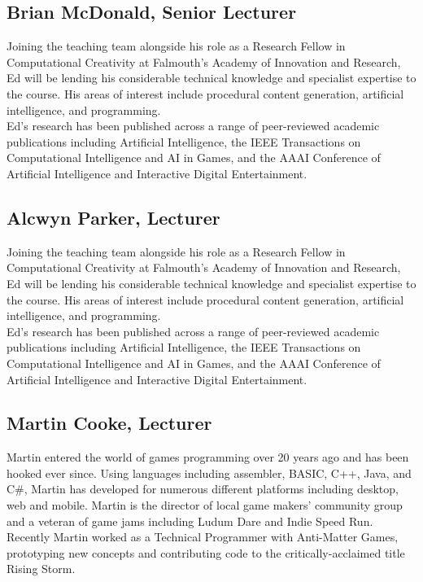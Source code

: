 \subsection{Brian McDonald, Senior Lecturer}

Joining the teaching team alongside his role as a Research Fellow in Computational Creativity at Falmouth's Academy of Innovation and Research, Ed will be lending his considerable technical knowledge and specialist expertise to the course. His areas of interest include procedural content generation, artificial intelligence, and programming. \\

Ed's research has been published across a range of peer-reviewed academic publications including Artificial Intelligence, the IEEE Transactions on Computational Intelligence and AI in Games, and the AAAI Conference of Artificial Intelligence and Interactive Digital Entertainment. \\

\subsection{Alcwyn Parker, Lecturer}

Joining the teaching team alongside his role as a Research Fellow in Computational Creativity at Falmouth's Academy of Innovation and Research, Ed will be lending his considerable technical knowledge and specialist expertise to the course. His areas of interest include procedural content generation, artificial intelligence, and programming. \\

Ed's research has been published across a range of peer-reviewed academic publications including Artificial Intelligence, the IEEE Transactions on Computational Intelligence and AI in Games, and the AAAI Conference of Artificial Intelligence and Interactive Digital Entertainment. \\

\subsection{Martin Cooke, Lecturer}

Martin entered the world of games programming over 20 years ago and has been hooked ever since. Using languages including assembler, BASIC, C++, Java, and C\#, Martin has developed for numerous different platforms including desktop, web and mobile. Martin is the director of local game makers’ community group and a veteran of game jams including Ludum Dare and Indie Speed Run. Recently Martin worked as a Technical Programmer with Anti-Matter Games, prototyping new concepts and contributing code to the critically-acclaimed title Rising Storm.\\

